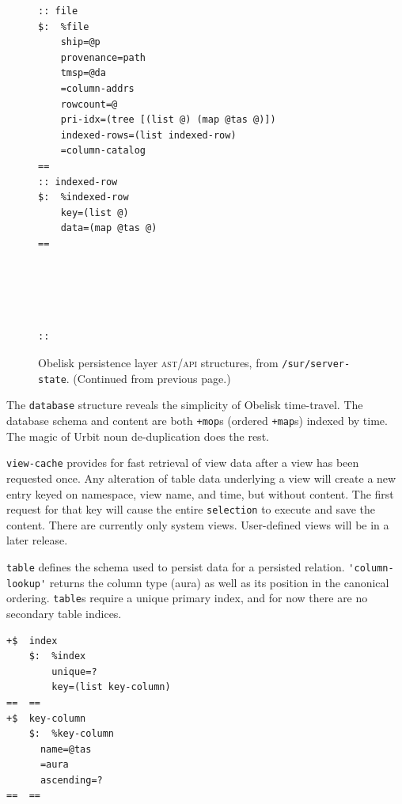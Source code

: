 \documentclass[twoside]{article}
\begin{document}
\begin{figure}[h]
\ContinuedFloat
\centering
\begin{lstlisting}[style=listingblock, basicstyle=\setmonofont\footnotesize,numbers=none, xleftmargin=3em, multicols=2, keepspaces=true, columns=flexible]
:: file
$:  %file
    ship=@p
    provenance=path
    tmsp=@da
    =column-addrs
    rowcount=@
    pri-idx=(tree [(list @) (map @tas @)])
    indexed-rows=(list indexed-row)
    =column-catalog  
==
:: indexed-row
$:  %indexed-row
    key=(list @)
    data=(map @tas @)
==





::
\end{lstlisting}
\caption{Obelisk persistence layer \textsc{ast}/\textsc{api} structures, from \texttt{/sur/server-state}.  (Continued from previous page.)}
\label{fig:obelisk_persistence_ast_2}
\end{figure}

The \lstinline[style=inlinecode]{database} structure reveals the simplicity of Obelisk time-travel. The database schema and content are both \lstinline[style=inlinecode]{+mop}s (ordered \lstinline[style=inlinecode]{+map}s) indexed by time. The magic of Urbit noun de-duplication does the rest.

\lstinline[style=inlinecode]{view-cache} provides for fast retrieval of view data after a view has been requested once. Any alteration of table data underlying a view will create a new entry keyed on namespace, view name, and time, but without content. The first request for that key will cause the entire \lstinline[style=inlinecode]{selection} to execute and save the content. There are currently only system views. User-defined views will be in a later release.

\lstinline[style=inlinecode]{table} defines the schema used to persist data for a persisted relation. \lstinline[style=inlinecode]{'column-lookup'} returns the column type (aura) as well as its position in the canonical ordering. \lstinline[style=inlinecode]{table}s require a unique primary index, and for now there are no secondary table indices.

\begin{lstlisting}[style=listingblock, label={lst:obelisk_table}]
+$  index
    $:  %index
        unique=?
        key=(list key-column)
==  ==
+$  key-column
    $:  %key-column
      name=@tas
      =aura
      ascending=?
==  ==
\end{lstlisting}
\end{document}
